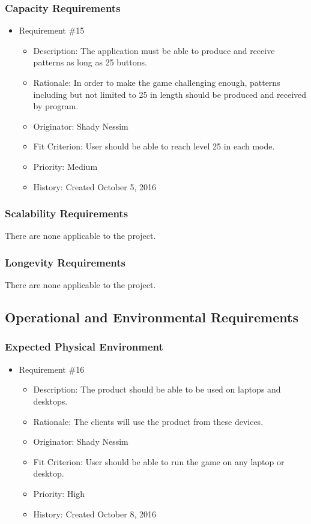 \documentclass[12pt, titlepage]{article}
\begin{document}
\subsubsection{Capacity Requirements}
\begin{itemize}

\item Requirement \#15 
\begin{itemize} 
\item Description: The application must be able to produce and receive patterns as long as 25 buttons.
\item Rationale: In order to make the game challenging enough, patterns including but not limited to 25 in length should be produced and received by program.
\item Originator: Shady Nessim 
\item Fit Criterion: User should be able to reach level 25 in each mode.
\item Priority: Medium 
\item History: Created October 5, 2016
\end{itemize}

\end{itemize}

\subsubsection{Scalability Requirements}
There are none applicable to the project.

\subsubsection{Longevity Requirements}
There are none applicable to the project.

\subsection{Operational and Environmental Requirements}
\subsubsection{Expected Physical Environment}
\begin{itemize}

\item Requirement \#16
\begin{itemize} 
\item Description: The product should be able to be used on laptops and desktops. 
\item Rationale: The clients will use the product from these devices.
\item Originator: Shady Nessim 
\item Fit Criterion: User should be able to run the game on any laptop or desktop.
\item Priority: High 
\item History: Created October 8, 2016
\end{itemize}

\end{itemize}
\end{document}
